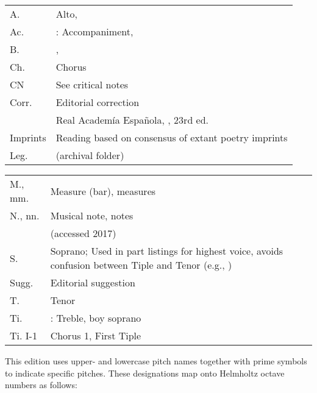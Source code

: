 
\begin{multicols}{2}
    \setlength{\parindent}{0pt}
    \begin{tabu} to \linewidth{lZ}
        A. & Alto, \\
        Ac. & : Accompaniment, \\
        B. & , \\
        Ch. & Chorus\\
        CN & See critical notes\\
        Corr. & Editorial correction\\
         & Real Academía Española, , 23rd ed.\\
        Imprints & Reading based on consensus of extant poetry imprints\\
        Leg. &  (archival folder)\\
    \end{tabu}

    \begin{tabu} to \linewidth{lZ}
        M., mm. & Measure (bar), measures\\
        N., nn. & Musical note, notes\\
         &  (accessed 2017)\\
        S. & Soprano; Used in part listings for highest voice, avoids
        confusion between Tiple and Tenor (e.g., )\\
        Sugg. & Editorial suggestion\\
        T. & Tenor\\
        Ti. & : Treble, boy soprano\\
        Ti. I-1 & Chorus 1, First Tiple\\
    \end{tabu}
\end{multicols}



This edition uses upper- and lowercase pitch names together with prime symbols
to indicate specific pitches.
These designations map onto Helmholtz octave numbers as follows:




